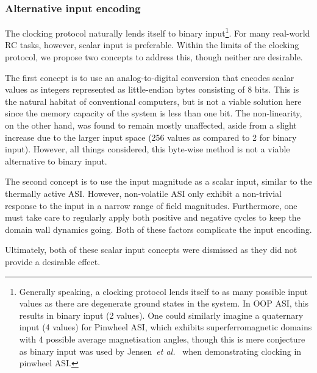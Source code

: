 \subsubsection{Alternative input encoding}
\label{sec:3:clocking_input_encoding}
The clocking protocol naturally lends itself to binary input\footnote{
	Generally speaking, a clocking protocol lends itself to as many possible input values as there are degenerate ground states in the system.
	In OOP ASI, this results in binary input (2 values).
	One could similarly imagine a quaternary input (4 values) for Pinwheel ASI, which exhibits superferromagnetic domains with 4 possible average magnetisation angles, though this is mere conjecture as binary input was used by Jensen~\textit{et al.}~\cite{clocking-protocol} when demonstrating clocking in pinwheel ASI.
}.
For many real-world RC tasks, however, scalar input is preferable.
Within the limits of the clocking protocol, we propose two concepts to address this, though neither are desirable. \par
The first concept is to use an analog-to-digital conversion that encodes scalar values as integers represented as little-endian bytes consisting of 8 bits.
This is the natural habitat of conventional computers, but is not a viable solution here since the memory capacity of the system is less than one bit.
The non-linearity, on the other hand, was found to remain mostly unaffected, aside from a slight increase due to the larger input space (256 values as compared to 2 for binary input).
However, all things considered, this byte-wise method is not a viable alternative to binary input. \par
The second concept is to use the input magnitude as a scalar input, similar to the thermally active ASI.
However, non-volatile ASI only exhibit a non-trivial response to the input in a narrow range of field magnitudes.
Furthermore, one must take care to regularly apply both positive and negative cycles to keep the domain wall dynamics going.
Both of these factors complicate the input encoding. \par
Ultimately, both of these scalar input concepts were dismissed as they did not provide a desirable effect.

